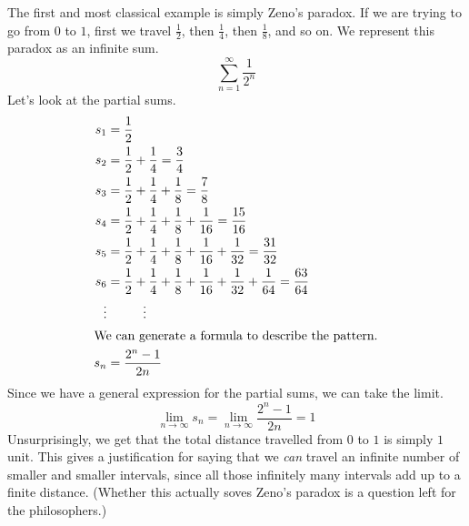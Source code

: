 \documentclass[fleqn,letterpaper]{report}
\begin{document}
\begin{example}The first and most classical example is simply
Zeno's paradox. If we are trying to go from $0$ to $1$, first
we travel $\frac{1}{2}$, then $\frac{1}{4}$, then
$\frac{1}{8}$, and so on. We represent this paradox
as an infinite sum. 
\begin{equation*}
\sum_{n=1}^\infty \frac{1}{2^n}
\end{equation*}
Let's look at the partial sums.
\begin{align*}
s_1 & = \frac{1}{2} \\
s_2 & = \frac{1}{2} + \frac{1}{4} = \frac{3}{4} \\
s_3 & = \frac{1}{2} + \frac{1}{4} + \frac{1}{8} = \frac{7}{8} \\
s_4 & = \frac{1}{2} + \frac{1}{4} + \frac{1}{8} + \frac{1}{16} =
\frac{15}{16} \\
s_5 & = \frac{1}{2} + \frac{1}{4} + \frac{1}{8} + \frac{1}{16} +
\frac{1}{32} = \frac{31}{32} \\
s_6 & = \frac{1}{2} + \frac{1}{4} + \frac{1}{8} + \frac{1}{16} +
\frac{1}{32} + \frac{1}{64} = \frac{63}{64} \\
\vdots & \hspace{1cm} \vdots \\
\intertext{We can generate a formula to describe the pattern.}
s_n & = \frac{2^n-1}{2n} 
\end{align*}
Since we have a general expression for the partial sums, we
can take the limit.
\begin{equation*}
\lim_{n \rightarrow \infty} s_n = \lim_{n \rightarrow \infty}
\frac{2^n - 1}{2n} = 1
\end{equation*}
Unsurprisingly, we get that the total distance travelled from
$0$ to $1$ is simply $1$ unit. This gives a justification for
saying that we \emph{can} travel an infinite number of smaller
and smaller intervals, since all those infinitely many
intervals add up to a finite distance. (Whether this actually
soves Zeno's paradox is a question left for the philosophers.) 
\end{example}
\end{document}
